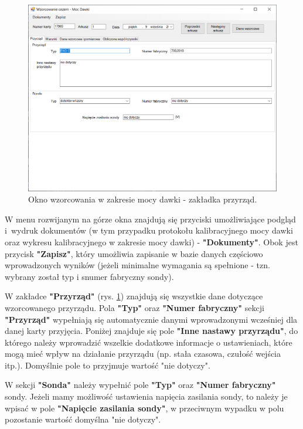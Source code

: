 \begin{figure}[htb]
	\centering
	\includegraphics[width=\columnwidth]{obrazki/Wzorcowanie/moc_dawki/przyrzad.png}
	\caption{Okno wzorcowania w zakresie mocy dawki - zakładka przyrząd.}
	\label{mocPrzyrzad}
\end{figure}

W menu rozwijanym na górze okna znajdują się przyciski umożliwiające podgląd i~wydruk dokumentów (w tym przypadku protokołu kalibracyjnego mocy dawki oraz wykresu kalibracyjnego w zakresie mocy dawki) - \textbf{"Dokumenty"}. Obok jest przycisk \textbf{"Zapisz"}, który umożliwia zapisanie w bazie danych częściowo wprowadzonych wyników (jeżeli minimalne wymagania są spełnione - tzn. wybrany został typ i snumer fabryczny sondy).

W zakładce \textbf{"Przyrząd"} (rys. \ref{mocPrzyrzad}) znajdują się wszystkie dane dotyczące wzorcowanego przyrządu. Pola \textbf{"Typ"} oraz \textbf{"Numer fabryczny"} sekcji \textbf{"Przyrząd"} wypełniają się automatycznie danymi wprowadzonymi wcześniej dla danej karty przyjęcia. Poniżej znajduje się pole \textbf{"Inne nastawy przyrządu"}, do którego należy wprowadzić wszelkie dodatkowe informacje o ustawieniach, które mogą mieć wpływ na działanie przyrządu (np. stała czasowa, czułość wejścia itp.). Domyślnie pole to przyjmuje wartość "nie dotyczy".
	
W sekcji \textbf{"Sonda"} należy wypełnić pole \textbf{"Typ"} oraz \textbf{"Numer fabryczny"} sondy. Jeżeli mamy możliwość ustawienia napięcia zasilania sondy, to należy je wpisać w pole \textbf{"Napięcie zasilania sondy"}, w przeciwnym wypadku w polu pozostanie wartość domyślna "nie dotyczy".

